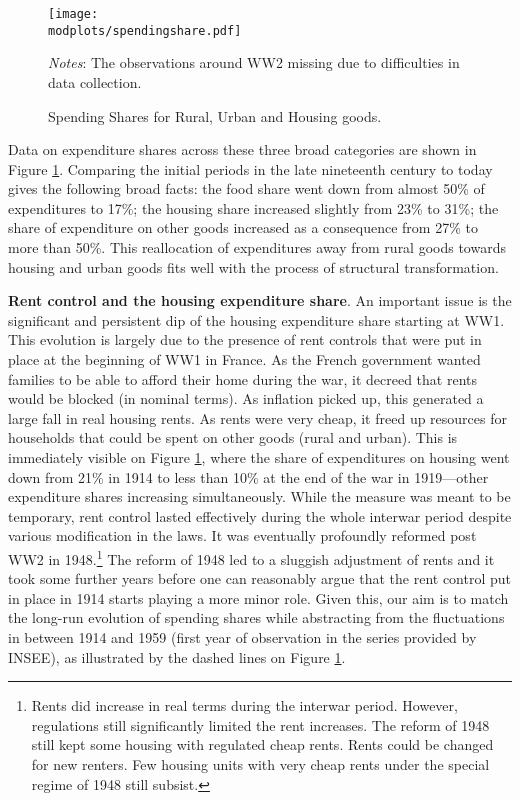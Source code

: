\documentclass[11pt]{report}
\newcommand{\round}{revision3}  %
\newcommand{\modplots}{../../output/model/plots/\round}
\begin{document}
\begin{figure}[h]
	\begin{center}
		\texttt{[image: \\modplots/spendingshare.pdf]}
	\end{center}
	\vspace{-0.5cm}
	\caption{Spending Shares for Rural, Urban and Housing goods.}
	\label{A-fig:spending-data}
	{\footnotesize \textit{Notes}: The observations around WW2 missing due to difficulties in data collection.}
	
\end{figure}

Data on expenditure shares across these three broad categories are shown in Figure \ref{A-fig:spending-data}. Comparing the initial periods in the late nineteenth century to today gives the following broad facts: the food share went down from almost 50\% of expenditures to 17\%; the housing share increased slightly from 23\% to 31\%; the share of expenditure on other goods increased as a consequence from 27\% to more than 50\%. This reallocation of expenditures away from rural goods towards housing and urban goods fits well with the process of structural transformation.  



\noindent \textbf{Rent control and the housing expenditure share}. An important issue is the significant and persistent dip of the housing expenditure share starting at WW1. This evolution is largely due to the presence of rent controls that were put in place at the beginning of WW1 in France. As the French government wanted families to be able to afford their home during the war, it decreed that rents would be blocked (in nominal terms). As inflation picked up, this generated a large fall in real housing rents. As rents were very cheap, it freed up resources for households that could be spent on other goods (rural and urban). This is immediately visible on Figure \ref{A-fig:spending-data}, where the share of expenditures on housing went down from 21\% in 1914 to less than 10\% at the end of the war in 1919---other expenditure shares increasing simultaneously. While the measure was meant to be temporary, rent control lasted effectively during the whole interwar period despite various modification in the laws. It was eventually profoundly reformed post WW2 in 1948.\footnote{Rents did increase in real terms during the interwar period. However, regulations still significantly limited the rent increases. The reform of 1948 still kept some housing with regulated cheap rents. Rents could be changed for new renters. Few housing units with very cheap rents under the special regime of 1948 still subsist.} The reform of 1948 led to a sluggish adjustment of rents and it took some further years before one can reasonably argue that the rent control put in place in 1914 starts playing a more minor role. Given this, our aim is to match the long-run evolution of spending shares while abstracting from the fluctuations in between 1914 and 1959 (first year of observation in the series provided by INSEE), as illustrated by the dashed lines on Figure \ref{A-fig:spending-data}.
\end{document}

